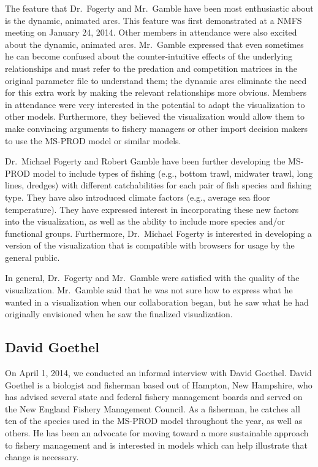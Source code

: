 The feature that Dr.\ Fogerty and Mr.\ Gamble have been most enthusiastic about is the dynamic, animated arcs.  This feature was first demonstrated at a NMFS meeting on January 24, 2014.  Other members in attendance were also excited about the dynamic, animated arcs.  Mr.\ Gamble expressed that even sometimes he can become confused about the counter-intuitive effects of the underlying relationships and must refer to the predation and competition matrices in the original parameter file to understand them; the dynamic arcs eliminate the need for this extra work by making the relevant relationships more obvious.  Members in attendance were very interested in the potential to adapt the visualization to other models.  Furthermore, they believed the visualization would allow them to make convincing arguments to fishery managers or other import decision makers to use the MS-PROD model or similar models.

Dr.\ Michael Fogerty and Robert Gamble have been further developing the MS-PROD model to include types of fishing (e.g., bottom trawl, midwater trawl, long lines, dredges) with different catchabilities for each pair of fish species and fishing type.  They have also introduced climate factors (e.g., average sea floor temperature).  They have expressed interest in incorporating these new factors into the visualization, as well as the ability to include more species and/or functional groups.  Furthermore, Dr.\ Michael Fogerty is interested in developing a version of the visualization that is compatible with browsers for usage by the general public.

In general, Dr.\ Fogerty and Mr.\ Gamble were satisfied with the quality of the visualization.  Mr.\ Gamble said that he was not sure how to express what he wanted in a visualization when our collaboration began, but he saw what he had originally envisioned when he saw the finalized visualization.  

\subsection{David Goethel}

On April 1, 2014, we conducted an informal interview with David Goethel.  David Goethel is a biologist and fisherman based out of Hampton, New Hampshire, who has advised several state and federal fishery management boards and served on the New England Fishery Management Council.  As a fisherman, he catches all ten of the species used in the MS-PROD model throughout the year, as well as others.  He has been an advocate for moving toward a more sustainable approach to fishery management and is interested in models which can help illustrate that change is necessary.  

